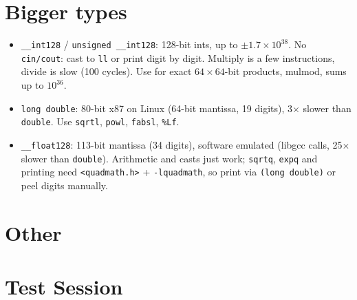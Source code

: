\section{Bigger types}
	\begin{itemize}[noitemsep]
		\item \texttt{\_\_int128} / \texttt{unsigned \_\_int128}: 128-bit ints, up to $\pm 1.7\times10^{38}$. No \texttt{cin/cout}: cast to \texttt{ll} or print digit by digit. Multiply is a few instructions, divide is slow (\tilde{}100 cycles). Use for exact $64\times64$-bit products, mulmod, sums up to $10^{36}$.
		\item \texttt{long double}: 80-bit x87 on Linux (64-bit mantissa, \tilde{}19 digits), \tilde{}3$\times$ slower than \texttt{double}. Use \texttt{sqrtl}, \texttt{powl}, \texttt{fabsl}, \texttt{\%Lf}.
		\item \texttt{\_\_float128}: 113-bit mantissa (\tilde{}34 digits), software emulated (libgcc calls, \tilde{}25$\times$ slower than \texttt{double}). Arithmetic and casts just work; \texttt{sqrtq}, \texttt{expq} and printing need \texttt{<quadmath.h>} + \texttt{-lquadmath}, so print via \texttt{(long double)} or peel digits manually.
	\end{itemize}

\section{Other}
\section{Test Session}

